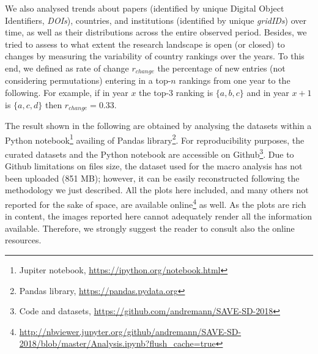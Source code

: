 \documentclass{llncs}
\begin{document}
We also analysed trends about papers (identified by unique Digital Object Identifiers, \textit{DOIs}), countries, and institutions (identified by unique \textit{gridIDs}) over time, as well as their distributions across the entire observed period.
Besides, we tried to assess to what extent the research landscape is open (or closed) to changes by measuring the variability of country rankings over the years. 
To this end, we defined as rate of change $r_{change}$ the percentage of new entries (not considering permutations) entering in a top-$n$ rankings from one year to the following.
For example, if in year $x$ the top-3 ranking is $\{a,b,c\}$ and in year $x+1$ is $\{a,c,d\}$ then $r_{change} = 0.33$.

The result shown in the following are obtained by analysing the datasets within a Python notebook\footnote{Jupiter notebook, \url{https://ipython.org/notebook.html}} availing of Pandas library\footnote{Pandas library, \url{https://pandas.pydata.org}}.
For reproducibility purposes, the curated datasets and the Python notebook are accessible on Github\footnote{Code and datasets, \url{https://github.com/andremann/SAVE-SD-2018}}.
Due to Github limitations on files size, the dataset used for the macro analysis has not been uploaded (851 MB); however, it can be easily reconstructed following the methodology we just described.
All the plots here included, and many others not reported for the sake of space, are available online\footnote{\url{http://nbviewer.jupyter.org/github/andremann/SAVE-SD-2018/blob/master/Analysis.ipynb?flush_cache=true}} as well.
As the plots are rich in content, the images reported here cannot adequately render all the information available. Therefore, we strongly suggest the reader to consult also the online resources.
\end{document}
